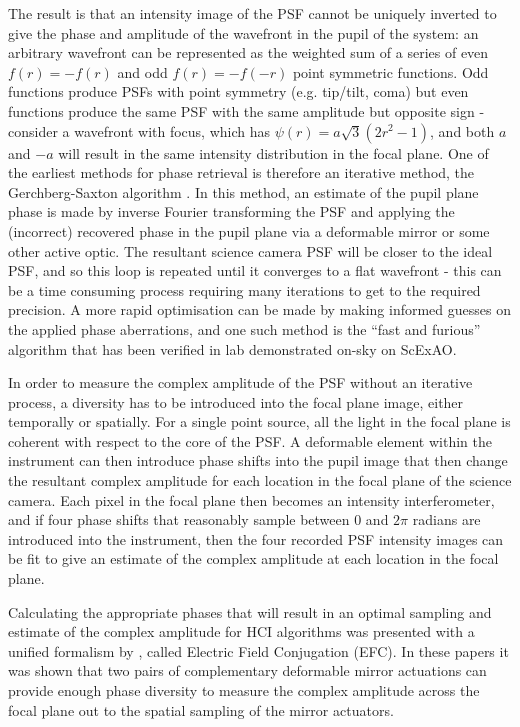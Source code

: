 \documentclass[letterpaper]{ar-1col}
\begin{document}
The result is that an intensity image of the PSF cannot be uniquely inverted to give the phase and amplitude of the wavefront in the pupil of the system: an arbitrary wavefront can be represented as the weighted sum of a series of even $f(r)=-f(r)$ and odd $f(r)=-f(-r)$ point symmetric functions.
%
Odd functions produce PSFs with point symmetry (e.g. tip/tilt, coma) but even functions produce the same PSF with the same amplitude but opposite sign - consider a wavefront with focus, which has $\psi(r) = a\sqrt{3}(2r^2-1)$, and both $a$ and $-a$ will result in the same intensity distribution in the focal plane.
%
One of the earliest methods for phase retrieval is therefore an iterative method, the Gerchberg-Saxton algorithm \citep{Gerchberg72}.
%
In this method, an estimate of the pupil plane phase is made by inverse Fourier transforming the PSF and applying the (incorrect) recovered phase in the pupil plane via a deformable mirror or some other active optic.
%
The resultant science camera PSF will be closer to the ideal PSF, and so this loop is repeated until it converges to a flat wavefront - this can be a time consuming process requiring many iterations to get to the required precision.
%
A more rapid optimisation can be made by making informed guesses on the applied phase aberrations\citep{Gonsalves02}, and one such method is the ``fast and furious'' algorithm \citep{Keller12} that has been verified in lab \citep{Wilby18} demonstrated on-sky \citep{Bos20} on ScExAO. 

In order to measure the complex amplitude of the PSF without an iterative process, a diversity has to be introduced into the focal plane image, either temporally or spatially.
%
For a single point source, all the light in the focal plane is coherent with respect to the core of the PSF.
%
A deformable element within the instrument can then introduce phase shifts into the pupil image that then change the resultant complex amplitude for each location in the focal plane of the science camera.
%
Each pixel in the focal plane then becomes an intensity interferometer, and if four phase shifts that reasonably sample between $0$ and $2\pi$ radians are introduced into the instrument, then the four recorded PSF intensity images can be fit to give an estimate of the complex amplitude at each location in the focal plane.

Calculating the appropriate phases that will result in an optimal sampling and estimate of the complex amplitude for HCI algorithms was presented with a unified formalism by \citet{Giveon09,Giveon10}, called Electric Field Conjugation (EFC).
%
In these papers it was shown that two pairs of complementary deformable mirror actuations can provide enough phase diversity to measure the complex amplitude across the focal plane out to the spatial sampling of the mirror actuators.
\end{document}
